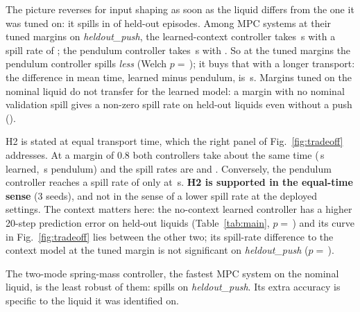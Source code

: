 The picture reverses for input shaping as soon as the liquid differs from the one it was tuned on: it spills in  of held-out episodes. Among MPC systems at their tuned margins on \emph{heldout\_push}, the learned-context controller takes \,s with a spill rate of ; the pendulum controller takes \,s with . So at the tuned margins the pendulum controller spills \emph{less} (Welch $p=\,$); it buys that with a longer transport: the difference in mean time, learned minus pendulum, is \,s. Margins tuned on the nominal liquid do not transfer for the learned model: a margin with no nominal validation spill gives a non-zero spill rate on held-out liquids even without a push ().

H2 is stated at equal transport time, which the right panel of Fig.~\ref{fig:tradeoff} addresses. At a margin of 0.8 both controllers take about the same time (\,s learned, \,s pendulum) and the spill rates are  and . Conversely, the pendulum controller reaches a spill rate of  only at \,s. \textbf{H2 is supported in the equal-time sense} (3 seeds), and not in the sense of a lower spill rate at the deployed settings. The context matters here: the no-context learned controller has a higher 20-step prediction error on held-out liquids (Table~\ref{tab:main}, $p=\,$) and its curve in Fig.~\ref{fig:tradeoff} lies between the other two; its spill-rate difference to the context model at the tuned margin is not significant on \emph{heldout\_push} ($p=\,$).

The two-mode spring-mass controller, the fastest MPC system on the nominal liquid, is the least robust of them:  spills on \emph{heldout\_push}. Its extra accuracy is specific to the liquid it was identified on.

